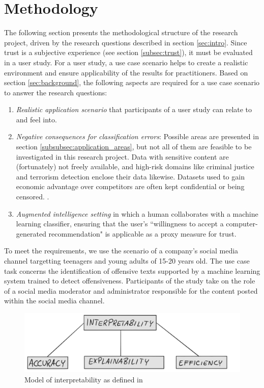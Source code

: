 \section{Methodology}
The following section presents the methodological structure of the research project, driven by the research questions described in section \ref{sec:intro}.\newline
Since trust is a subjective experience (see section \ref{subsec:trust}), it must be evaluated in a user study. For a user study, a use case scenario helps to create a realistic environment and ensure applicability of the results for practitioners. Based on section \ref{sec:background}, the following aspects are required for a use case scenario to answer the research questions:
\begin{enumerate}
	\item \textit{Realistic application scenario} that participants of a user study can relate to and feel into.
	\item \textit{Negative consequences for classification errors}: Possible areas are presented in section \ref{subsubsec:application_areas}, but not all of them are feasible to be investigated in this research project. Data with sensitive content are (fortunately) not freely available, and high-risk domains like criminal justice and terrorism detection enclose their data likewise. Datasets used to gain economic advantage over competitors are often kept confidential or being censored. \cite{diakopoulos2016accountability}.
	\item \textit{Augmented intelligence setting} in which a human collaborates with a machine learning classifier, ensuring that the user's ``willingness to accept a computer-generated recommendation" \cite{vorm2018assessing} is applicable as a proxy measure for trust.
\end{enumerate}
To meet the requirements, we use the scenario of a company's social media channel targetting teenagers and young adults of 15-20 years old. The use case task concerns the identification of offensive texts supported by a machine learning system trained to detect offensiveness. Participants of the study take on the role of a social media moderator and administrator responsible for the content posted within the social media channel. 
\begin{figure} [H]
	\centering
	\includegraphics[width=0.7\linewidth]{img/model}
	\caption{Model of interpretability as defined in \cite{ruping2006learning}}
	\label{fig:model_interpretability}
\end{figure}
